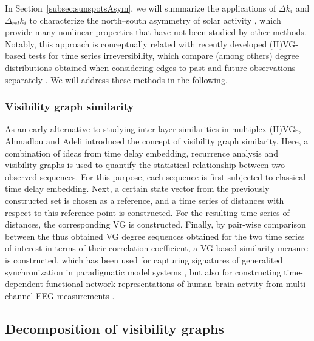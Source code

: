 In Section~\ref{subsec:sunspotsAsym}, we will summarize the applications of $\Delta k_i$ and $\Delta_{rel} k_i$ to characterize the north--south asymmetry of solar activity \cite{Zou2014}, which provide many nonlinear properties that have not been studied by other methods. Notably, this approach is conceptually related with recently developed (H)VG-based tests for time series irreversibility, which compare (among others) degree distributions obtained when considering edges to past and future observations separately \citep{Donges2013}. We will address these methods in the following.

        \subsubsection{Visibility graph similarity}
						
As an early alternative to studying inter-layer similarities in multiplex (H)VGs, Ahmadlou and Adeli \cite{Ahmadlou2012a} introduced the concept of visibility graph similarity. Here, a combination of ideas from time delay embedding, recurrence analysis and visibility graphs is used to quantify the statistical relationship between two observed sequences. For this purpose, each sequence is first subjected to classical time delay embedding. Next, a certain state vector from the previously constructed set is chosen as a reference, and a time series of distances with respect to this reference point is constructed. For the resulting time series of distances, the corresponding VG is constructed. Finally, by pair-wise comparison between the thus obtained VG degree sequences obtained for the two time series of interest in terms of their correlation coefficient, a VG-based similarity measure is constructed, which has been used for capturing signatures of generalited synchronization in paradigmatic model systems \cite{Ahmadlou2012a}, but also for constructing time-dependent functional network representations of human brain actvity from multi-channel EEG measurements \cite{Sengupta2013}.

                        
	\subsection{Decomposition of visibility graphs} \label{sec:timeIRvg}
